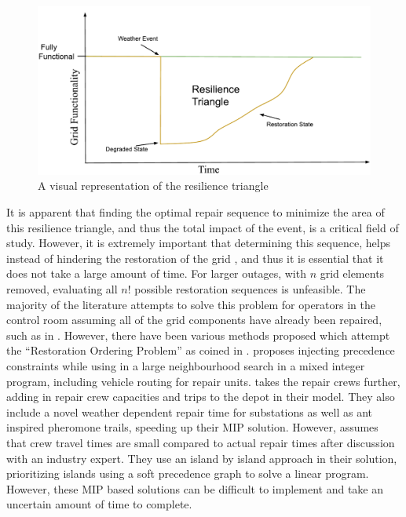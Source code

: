 \documentclass[12pt]{article}
\begin{document}
\begin{figure}[ht]
    \centering %
    \includegraphics[width=\textwidth]{Resilience Triangle.pdf}
    \caption[Resilience Triangle]{A visual representation of the resilience triangle}
    \label{fig:resiliencetriangle}
\end{figure}
It is apparent that finding the optimal repair sequence to minimize the area of this resilience triangle, and thus the total impact of the event, is a critical field of study. However, it is extremely important that determining this sequence, helps instead of hindering the restoration of the grid \cite{ancona},  and thus it is essential that it does not take a large amount of time. For larger outages, with $n$ grid elements removed, evaluating all $n!$ possible restoration sequences is unfeasible. The majority of the literature attempts to solve this problem for operators in the control room \cite{yan} assuming all of the grid components have already been repaired, such as in \cite{chen}\cite{thiebaux}.  However, there have been various methods proposed which attempt the “Restoration Ordering Problem” as coined in \cite{coffrin2012}. \cite{coffrin2011} proposes injecting precedence constraints while using in a large neighbourhood search in a mixed integer program, including vehicle routing for repair units. \cite{yan} takes the repair crews further, adding in repair crew capacities and trips to the depot in their model. They also include a novel weather dependent repair time for substations as well as ant inspired pheromone trails, speeding up their MIP solution. However, \cite{tan} assumes that crew travel times are small compared to actual repair times after discussion with an industry expert. They use an island by island approach in their solution, prioritizing islands using a soft precedence graph to solve a linear program. However, these MIP based solutions can be difficult to implement and take an uncertain amount of time to complete. \par
\end{document}
